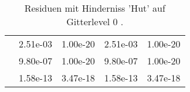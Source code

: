 \begin{table}
\begin{tabular}{c|cc|cc|}
\multicolumn{1}{|c|}{} & \multicolumn{1}{|c|}{  2.51e-03} & \multicolumn{1}{|c|}{  1.00e-20} & \multicolumn{1}{|c|}{  2.51e-03} & \multicolumn{1}{|c|}{  1.00e-20} \\ 
\multicolumn{1}{|c|}{} & \multicolumn{1}{|c|}{  9.80e-07} & \multicolumn{1}{|c|}{  1.00e-20} & \multicolumn{1}{|c|}{  9.80e-07} & \multicolumn{1}{|c|}{  1.00e-20} \\ 
\multicolumn{1}{|c|}{} & \multicolumn{1}{|c|}{  1.58e-13} & \multicolumn{1}{|c|}{  3.47e-18} & \multicolumn{1}{|c|}{  1.58e-13} & \multicolumn{1}{|c|}{  3.47e-18} \\ 
\hline 
\end{tabular}\caption{Residuen mit Hinderniss 'Hut' auf Gitterlevel 0 .}\label{tab:Residuum_Hut_level0}
\end{table} 
